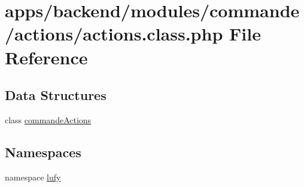\hypertarget{backend_2modules_2commande_2actions_2actions_8class_8php}{\section{apps/backend/modules/commande/actions/actions.class.\-php File Reference}
\label{backend_2modules_2commande_2actions_2actions_8class_8php}
}
\subsection*{Data Structures}
\begin{DoxyCompactItemize}
\item 
class \hyperlink{classcommande_actions}{commande\-Actions}
\end{DoxyCompactItemize}
\subsection*{Namespaces}
\begin{DoxyCompactItemize}
\item 
namespace \hyperlink{namespacelufy}{lufy}
\end{DoxyCompactItemize}
